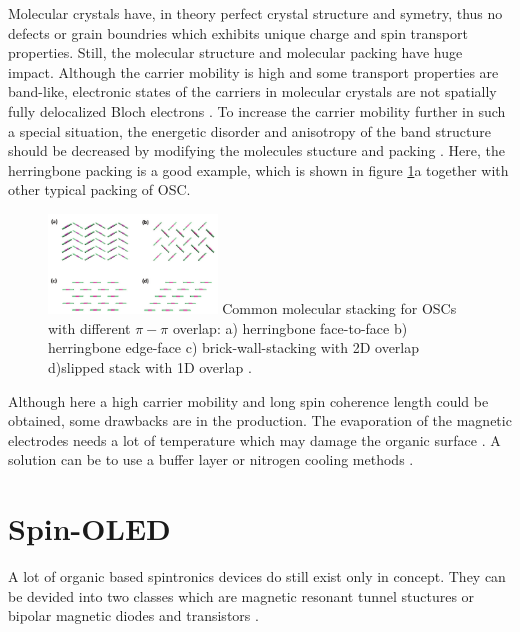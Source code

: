 Molecular crystals have, in theory perfect crystal structure and symetry, thus no defects or grain boundries which exhibits unique charge and spin transport properties.
Still, the molecular structure and molecular packing have huge impact.
Although the carrier mobility is high and some transport properties are band-like, electronic states of the carriers in molecular crystals are not spatially fully delocalized Bloch electrons \cite{perovskite}.
To increase the carrier mobility further in such a special situation, the energetic disorder and anisotropy of the band structure should be decreased by modifying the molecules stucture and packing \cite{perovskite}.
Here, the herringbone packing is a good example, which is shown in figure \ref{fig:packing}a together with other typical packing of OSC.

\begin{figure}
    \centering
  \captionsetup{width=0.7\linewidth}
  \includegraphics[width=0.4\textwidth]{graphics/packing.png}
  { Common molecular stacking for OSCs with different $\pi - \pi$ overlap: a) herringbone face-to-face b) herringbone edge-face c) brick-wall-stacking with 2D overlap d)slipped stack with 1D overlap \cite{single-crystals}.}
  \label{fig:packing}
\end{figure}

Although here a high carrier mobility and long spin coherence length could be obtained, some drawbacks are in the production.
The evaporation of the magnetic electrodes needs a lot of temperature which may damage the organic surface \cite{perovskite} \cite{single-crystals}.
A solution can be to use a buffer layer or nitrogen cooling methods \cite{perovskite}.


\section{Spin-OLED}
\label{sec:device}
A lot of organic based spintronics devices do still exist only in concept.
They can be devided into two classes which are magnetic resonant tunnel stuctures or bipolar magnetic diodes and transistors \cite{SC-spintronics}.

